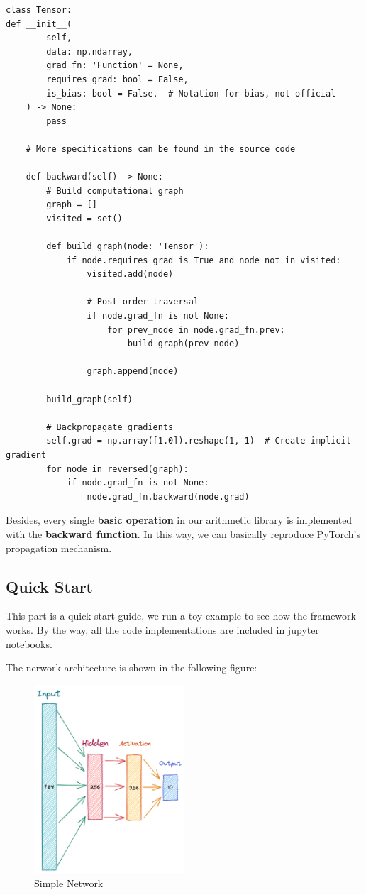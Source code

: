 \documentclass[a4paper, 11pt]{article} %
\begin{document}
\begin{lstlisting}
class Tensor:
def __init__(
		self,
		data: np.ndarray,
		grad_fn: 'Function' = None,
		requires_grad: bool = False,
		is_bias: bool = False,  # Notation for bias, not official
	) -> None:
		pass

	# More specifications can be found in the source code

	def backward(self) -> None:
	    # Build computational graph
        graph = []
        visited = set()

        def build_graph(node: 'Tensor'):
            if node.requires_grad is True and node not in visited:
                visited.add(node)

                # Post-order traversal
                if node.grad_fn is not None:
                    for prev_node in node.grad_fn.prev:
                        build_graph(prev_node)

                graph.append(node)

        build_graph(self)

        # Backpropagate gradients
        self.grad = np.array([1.0]).reshape(1, 1)  # Create implicit gradient
        for node in reversed(graph):
            if node.grad_fn is not None:
                node.grad_fn.backward(node.grad)
\end{lstlisting}

Besides, every single \textbf{basic operation} in our arithmetic library is implemented
with the \textbf{backward function}. In this way, we can basically reproduce PyTorch's
propagation mechanism.

\subsection{\textbf{Quick Start}}

This part is a quick start guide, we run a toy example to see how the framework works. By
the way, all the code implementations are included in jupyter notebooks.

The nerwork architecture is shown in the following figure:

\begin{figure}[H]
    \centering
    \includegraphics[width=0.5\textwidth]{./img/simple-network.png}
    \caption{Simple Network}
\end{figure}
\end{document}
